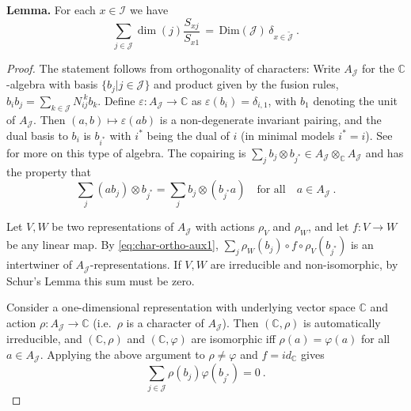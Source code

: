 \documentclass[11pt,a4paper]{article}
\numberwithin{equation}{section}
\begin{document}
\bigskip

\noindent
\textbf{Lemma.} For each $x \in \mathcal{I}$ we have
\begin{equation}\label{eq:char-ortho}
    \sum_{j \in \mathcal{J}} \dim(j)  \frac{S_{xj}}{S_{x1}} 
    \,=\, 
    \mathrm{Dim}(\mathcal{J}) \, \delta_{x \in \widetilde{\mathcal{J}}} \ .
\end{equation}

\begin{proof}
The statement follows from orthogonality of characters:
Write $A_{\mathcal{J}}$ for the $\mathbb{C}$-algebra with basis $\{ b_j | j \in \mathcal{J}\}$ and product given by the fusion rules, $b_i b_j = \sum_{k \in \mathcal{J}} N_{ij}^{~k} b_k$. 
Define $\varepsilon : A_{\mathcal{J}} \to \mathbb{C}$ as $\varepsilon(b_i) = \delta_{i,1}$, with $b_1$ denoting the unit of $A_{\mathcal{J}}$. Then $(a,b) \mapsto \varepsilon(ab)$ is a non-degenerate invariant pairing, and the dual basis to $b_i$ is $b_{i^*}$ with $i^*$ being the dual of $i$ (in minimal models $i^*=i$). See \cite[Ch.\,3]{EGNO-book} for more on this type of algebra.
The copairing is $\sum_j b_j \otimes b_{j^*} \in A_{\mathcal{J}} \otimes_{\mathbb{C}} A_{\mathcal{J}}$ and has the property that 
\begin{equation}\label{eq:char-ortho-aux1}
    \sum_j (a b_j) \otimes b_{j^*} = \sum_j b_j \otimes (b_{j^*} a)
    \quad \text{for all} \quad a \in A_{\mathcal{J}} \ .
\end{equation}

Let $V,W$ be two representations of $A_{\mathcal{J}}$ with actions $\rho_V$ and $\rho_W$, and let $f:V \to W$ be any linear map. By \eqref{eq:char-ortho-aux1}, $\sum_j \rho_W(b_j) \circ f \circ \rho_V(b_{j^*})$ is an intertwiner of $A_{\mathcal{J}}$-representations. If $V,W$ are irreducible and non-isomorphic, by Schur's Lemma this sum must be zero. 

Consider a one-dimensional representation with underlying vector space $\mathbb{C}$ and action $\rho : A_{\mathcal{J}} \to \mathbb{C}$ (i.e.\ $\rho$ is a character of $A_{\mathcal{J}}$). Then $(\mathbb{C},\rho)$ is automatically irreducible, and $(\mathbb{C},\rho)$ and $(\mathbb{C},\varphi)$ are isomorphic iff $\rho(a)=\varphi(a)$ for all $a \in A_{\mathcal{J}}$.
Applying the above argument to $\rho \neq \varphi$ and $f = id_{\mathbb{C}}$ gives
\begin{equation}\label{eq:char-ortho-aux2}
    \sum_{j \in \mathcal{J}} \rho(b_j) \varphi(b_{j^*}) = 0 \ .
\end{equation}


\end{proof}
\end{document}
